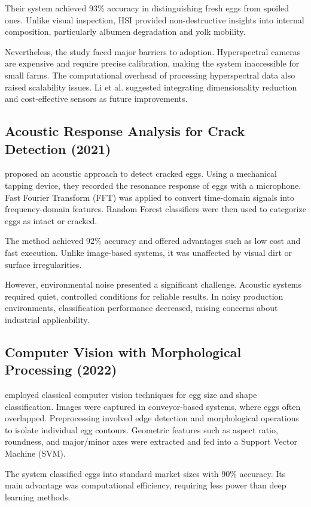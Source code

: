 \documentclass[conference]{IEEEtran}
\begin{document}
	Their system achieved 93\% accuracy in distinguishing fresh eggs from spoiled ones. Unlike visual inspection, HSI provided non-destructive insights into internal composition, particularly albumen degradation and yolk mobility.  
	
	Nevertheless, the study faced major barriers to adoption. Hyperspectral cameras are expensive and require precise calibration, making the system inaccessible for small farms. The computational overhead of processing hyperspectral data also raised scalability issues. Li et al. suggested integrating dimensionality reduction and cost-effective sensors as future improvements.
	
	\subsection{Acoustic Response Analysis for Crack Detection (2021)}
	\cite{wang2021acoustic} proposed an acoustic approach to detect cracked eggs. Using a mechanical tapping device, they recorded the resonance response of eggs with a microphone. Fast Fourier Transform (FFT) was applied to convert time-domain signals into frequency-domain features. Random Forest classifiers were then used to categorize eggs as intact or cracked.  
	
	The method achieved 92\% accuracy and offered advantages such as low cost and fast execution. Unlike image-based systems, it was unaffected by visual dirt or surface irregularities.  
	
	However, environmental noise presented a significant challenge. Acoustic systems required quiet, controlled conditions for reliable results. In noisy production environments, classification performance decreased, raising concerns about industrial applicability.
	
	\subsection{Computer Vision with Morphological Processing (2022)}
	\cite{singh2022vision} employed classical computer vision techniques for egg size and shape classification. Images were captured in conveyor-based systems, where eggs often overlapped. Preprocessing involved edge detection and morphological operations to isolate individual egg contours. Geometric features such as aspect ratio, roundness, and major/minor axes were extracted and fed into a Support Vector Machine (SVM).  
	
	The system classified eggs into standard market sizes with 90\% accuracy. Its main advantage was computational efficiency, requiring less power than deep learning methods.  
	
\end{document}
